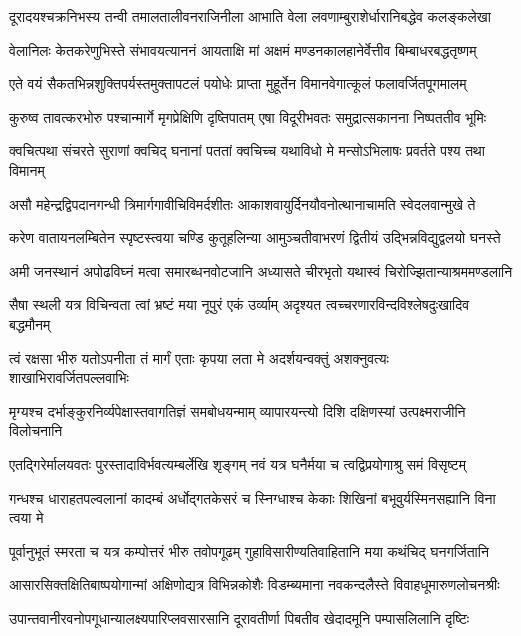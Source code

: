 \twolineshloka
{दूरादयश्चक्रनिभस्य तन्वी तमालतालीवनराजिनीला}
{आभाति वेला लवणाम्बुराशेर्धारानिबद्धेव कलङ्कलेखा}%

\twolineshloka
{वेलानिलः केतकरेणुभिस्ते संभावयत्याननं आयताक्षि}
{मां अक्षमं मण्डनकालहानेर्वेत्तीव बिम्बाधरबद्धतृष्णम्}%

\twolineshloka
{एते वयं सैकतभिन्नशुक्तिपर्यस्तमुक्तापटलं पयोधेः}
{प्राप्ता मुहूर्तेन विमानवेगात्कूलं फलावर्जितपूगमालम्}%

\twolineshloka
{कुरुष्व तावत्करभोरु पश्चान्मार्गे मृगप्रेक्षिणि दृष्तिपातम्}
{एषा विदूरीभवतः समुद्रात्सकानना निष्पततीव भूमिः}%

\twolineshloka
{क्वचित्पथा संचरते सुराणां क्वचिद् घनानां पततां क्वचिच्च}
{यथाविधो मे मन्सोऽभिलाषः प्रवर्तते पश्य तथा विमानम्}%

\twolineshloka
{असौ महेन्द्रद्विपदानगन्धी त्रिमार्गगावीचिविमर्दशीतः}
{आकाशवायुर्दिनयौवनोत्थानाचामति स्वेदलवान्मुखे ते}%

\twolineshloka
{करेण वातायनलम्बितेन स्पृष्टस्त्वया चण्डि कुतूहलिन्या}
{आमुञ्चतीवाभरणं द्वितीयं उद्भिन्नविद्युद्वलयो घनस्ते}%

\twolineshloka
{अमी जनस्थानं अपोढविघ्नं मत्वा समारब्धनवोटजानि}
{अध्यासते चीरभृतो यथास्वं चिरोज्झितान्याश्रममण्डलानि}%

\twolineshloka
{सैषा स्थली यत्र विचिन्वता त्वां भ्रष्टं मया नूपुरं एकं उर्व्याम्}
{अदृश्यत त्वच्चरणारविन्दविश्लेषदुःखादिव बद्धमौनम्}%

\twolineshloka
{त्वं रक्षसा भीरु यतोऽपनीता तं मार्गं एताः कृपया लता मे}
{अदर्शयन्वक्तुं अशक्नुवत्यः शाखाभिरावर्जितपल्लवाभिः}%

\twolineshloka
{मृग्यश्च दर्भाङ्कुरनिर्व्यपेक्षास्तवागतिज्ञं समबोधयन्माम्}
{व्यापारयन्त्यो दिशि दक्षिणस्यां उत्पक्ष्मराजीनि विलोचनानि}%

\twolineshloka
{एतद्गिरेर्मालयवतः पुरस्तादाविर्भवत्यम्बर्लेखि शृङ्गम्}
{नवं यत्र घनैर्मया च त्वद्विप्रयोगाश्रु समं विसृष्टम्}%

\twolineshloka
{गन्धश्च धाराहतपल्वलानां कादम्बं अर्धोद्गतकेसरं च}
{स्निग्धाश्च केकाः शिखिनां बभूवुर्यस्मिनसह्यानि विना त्वया मे}%

\twolineshloka
{पूर्वानुभूतं स्मरता च यत्र कम्पोत्तरं भीरु तवोपगूढम्}
{गुहाविसारीण्यतिवाहितानि मया कथंचिद् घनगर्जितानि}%

\twolineshloka
{आसारसिक्तक्षितिबाष्पयोगान्मां अक्षिणोद्यत्र विभिन्नकोशैः}
{विडम्ब्यमाना नवकन्दलैस्ते विवाहधूमारुणलोचनश्रीः}%

\twolineshloka
{उपान्तवानीरवनोपगूधान्यालक्ष्यपारिप्लवसारसानि}
{दूरावतीर्णा पिबतीव खेदादमूनि पम्पासलिलानि दृष्टिः}%

